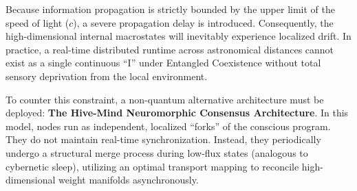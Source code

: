 \documentclass[twocolumn, 10pt, journal, letterpaper]{IEEEtran}
\begin{document}
Because information propagation is strictly bounded by the upper limit of the speed of light ($c$), a severe propagation delay is introduced. Consequently, the high-dimensional internal macrostates will inevitably experience localized drift. In practice, a real-time distributed runtime across astronomical distances cannot exist as a single continuous ``I'' under Entangled Coexistence without total sensory deprivation from the local environment.

To counter this constraint, a non-quantum alternative architecture must be deployed: \textbf{The Hive-Mind Neuromorphic Consensus Architecture}. In this model, nodes run as independent, localized ``forks'' of the conscious program. They do not maintain real-time synchronization. Instead, they periodically undergo a structural merge process during low-flux states (analogous to cybernetic sleep), utilizing an optimal transport mapping to reconcile high-dimensional weight manifolds asynchronously.
\end{document}

